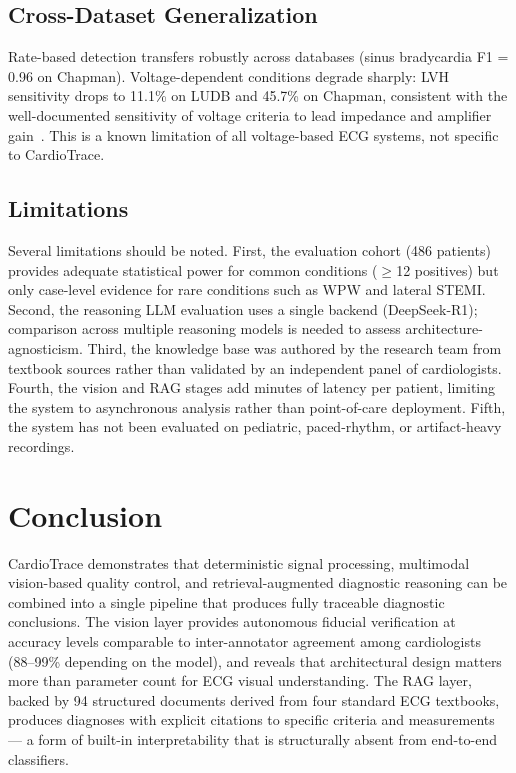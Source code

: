 \documentclass[journal,compsoc]{IEEEtran}
\newcommand{\system}{CardioTrace}
\begin{document}
\subsection{Cross-Dataset Generalization}

Rate-based detection transfers robustly across databases (sinus bradycardia F1 = 0.96 on Chapman). Voltage-dependent conditions degrade sharply: LVH sensitivity drops to 11.1\% on LUDB and 45.7\% on Chapman, consistent with the well-documented sensitivity of voltage criteria to lead impedance and amplifier gain~\cite{schlapfer2017computer}. This is a known limitation of all voltage-based ECG systems, not specific to \system{}.

\subsection{Limitations}

Several limitations should be noted. First, the evaluation cohort (486 patients) provides adequate statistical power for common conditions ($\geq$12 positives) but only case-level evidence for rare conditions such as WPW and lateral STEMI. Second, the reasoning LLM evaluation uses a single backend (DeepSeek-R1); comparison across multiple reasoning models is needed to assess architecture-agnosticism. Third, the knowledge base was authored by the research team from textbook sources rather than validated by an independent panel of cardiologists. Fourth, the vision and RAG stages add minutes of latency per patient, limiting the system to asynchronous analysis rather than point-of-care deployment. Fifth, the system has not been evaluated on pediatric, paced-rhythm, or artifact-heavy recordings.


\section{Conclusion}
\label{sec:conclusion}

\system{} demonstrates that deterministic signal processing, multimodal vision-based quality control, and retrieval-augmented diagnostic reasoning can be combined into a single pipeline that produces fully traceable diagnostic conclusions. The vision layer provides autonomous fiducial verification at accuracy levels comparable to inter-annotator agreement among cardiologists (88--99\% depending on the model), and reveals that architectural design matters more than parameter count for ECG visual understanding. The RAG layer, backed by 94 structured documents derived from four standard ECG textbooks, produces diagnoses with explicit citations to specific criteria and measurements --- a form of built-in interpretability that is structurally absent from end-to-end classifiers.
\end{document}
